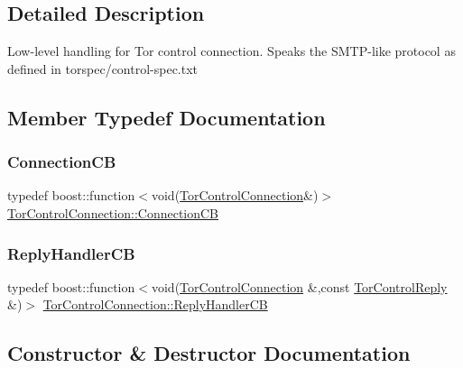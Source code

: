 \subsection{Detailed Description}
Low-\/level handling for Tor control connection. Speaks the S\+M\+T\+P-\/like protocol as defined in torspec/control-\/spec.\+txt 

\subsection{Member Typedef Documentation}
\mbox{\label{class_tor_control_connection_a30ec1d9f7e35720dc435e555e212ad73}} 
\subsubsection{\texorpdfstring{Connection\+CB}{ConnectionCB}}
{\footnotesize\ttfamily typedef boost\+::function$<$void(\mbox{\hyperlink{class_tor_control_connection}{Tor\+Control\+Connection}}\&)$>$ \mbox{\hyperlink{class_tor_control_connection_a30ec1d9f7e35720dc435e555e212ad73}{Tor\+Control\+Connection\+::\+Connection\+CB}}}

\mbox{\label{class_tor_control_connection_a67d9147b8c27456cc7fe15e4d6d8e844}} 
\subsubsection{\texorpdfstring{Reply\+Handler\+CB}{ReplyHandlerCB}}
{\footnotesize\ttfamily typedef boost\+::function$<$void(\mbox{\hyperlink{class_tor_control_connection}{Tor\+Control\+Connection}} \&,const \mbox{\hyperlink{class_tor_control_reply}{Tor\+Control\+Reply}} \&)$>$ \mbox{\hyperlink{class_tor_control_connection_a67d9147b8c27456cc7fe15e4d6d8e844}{Tor\+Control\+Connection\+::\+Reply\+Handler\+CB}}}



\subsection{Constructor \& Destructor Documentation}
\mbox{\label{class_tor_control_connection_a5850ebb205bddf1fbc97271fae8eaf78}} 
